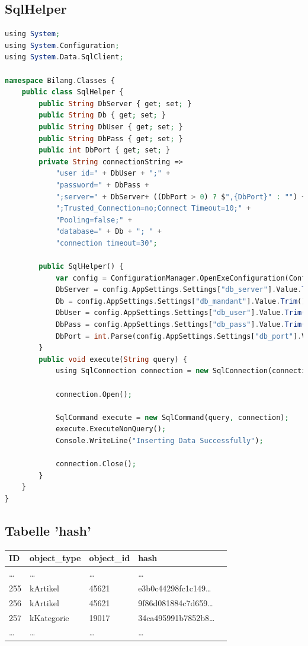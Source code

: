 \subsection{SqlHelper}
\label{sec:sql_helper}
\begin{lstlisting}[language=php]
using System;
using System.Configuration;
using System.Data.SqlClient;

namespace Bilang.Classes {
    public class SqlHelper {
        public String DbServer { get; set; }
        public String Db { get; set; }
        public String DbUser { get; set; }
        public String DbPass { get; set; }
        public int DbPort { get; set; }
        private String connectionString =>
            "user id=" + DbUser + ";" +
            "password=" + DbPass +
            ";server=" + DbServer+ ((DbPort > 0) ? $",{DbPort}" : "") +
            ";Trusted_Connection=no;Connect Timeout=10;" +
            "Pooling=false;" +
            "database=" + Db + "; " +
            "connection timeout=30";

        public SqlHelper() {
            var config = ConfigurationManager.OpenExeConfiguration(ConfigurationUserLevel.None);
            DbServer = config.AppSettings.Settings["db_server"].Value.Trim();
            Db = config.AppSettings.Settings["db_mandant"].Value.Trim();
            DbUser = config.AppSettings.Settings["db_user"].Value.Trim();
            DbPass = config.AppSettings.Settings["db_pass"].Value.Trim();
            DbPort = int.Parse(config.AppSettings.Settings["db_port"].Value.Trim());
        }
        public void execute(String query) {
            using SqlConnection connection = new SqlConnection(connectionString);
            
            connection.Open();

            SqlCommand execute = new SqlCommand(query, connection);
            execute.ExecuteNonQuery();
            Console.WriteLine("Inserting Data Successfully");

            connection.Close();
        }
    }
}
\end{lstlisting}

\subsection{Tabelle 'hash'}
\label{sec:table_hash}
\begin{tabular}{ |l|l|l|l|l| }
	\hline
	ID & object\_type & object\_id & hash \\ 
	\hline
	\dots & \dots & \dots & \dots\\  
	255 & kArtikel & 45621 & e3b0c44298fc1c149\dots\\  
	256 & kArtikel & 45621 & 9f86d081884c7d659\dots\\  
	257 & kKategorie & 19017 & 34ca495991b7852b8\dots\\  
	\dots & \dots & \dots & \dots\\  
	\hline
\end{tabular}

